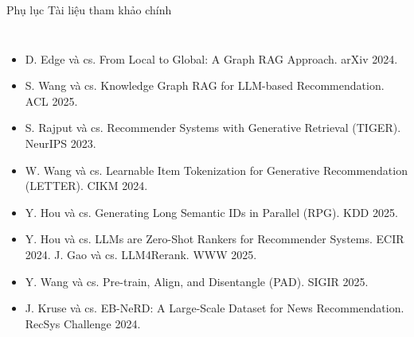 \documentclass[aspectratio=169,t]{beamer}
\begin{document}
\begin{frame}[shrink]{Phụ lục \textperiodcentered{} Tài liệu tham khảo chính}
\begin{columns}[T,onlytextwidth]
\begin{itemize}
  \item D. Edge và cs. From Local to Global: A Graph RAG Approach. arXiv 2024.
  \item S. Wang và cs. Knowledge Graph RAG for LLM-based Recommendation. ACL 2025.
  \item S. Rajput và cs. Recommender Systems with Generative Retrieval (TIGER). NeurIPS 2023.
  \item W. Wang và cs. Learnable Item Tokenization for Generative Recommendation (LETTER). CIKM 2024.
  \item Y. Hou và cs. Generating Long Semantic IDs in Parallel (RPG). KDD 2025.
  \item Y. Hou và cs. LLMs are Zero-Shot Rankers for Recommender Systems. ECIR 2024. \quad J. Gao và cs. LLM4Rerank. WWW 2025.
  \item Y. Wang và cs. Pre-train, Align, and Disentangle (PAD). SIGIR 2025.
  \item J. Kruse và cs. EB-NeRD: A Large-Scale Dataset for News Recommendation. RecSys Challenge 2024.
\end{itemize}
\end{columns}
\par\kern0pt%
\end{frame}
\end{document}

